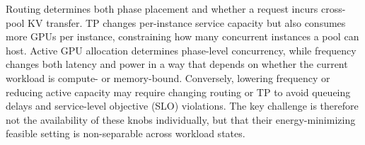 Routing determines both phase placement and whether a request incurs cross-pool KV transfer. 
TP changes per-instance service capacity but also consumes more GPUs per instance, constraining how many concurrent instances a pool can host. 
Active GPU allocation determines phase-level concurrency, while frequency changes both latency and power in a way that depends on whether the current workload is compute- or memory-bound. 
Conversely, lowering frequency or reducing active capacity may require changing routing or TP to avoid queueing delays and service-level objective (SLO) violations.
The key challenge is therefore not the availability of these knobs individually, but that their energy-minimizing feasible setting is non-separable across workload states.


